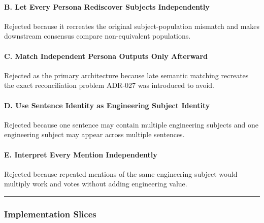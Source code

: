 \hypertarget{b-let-every-persona-rediscover-subjects-independently}{%
\paragraph{B. Let Every Persona Rediscover Subjects Independently}\label{b-let-every-persona-rediscover-subjects-independently}}

Rejected because it recreates the original subject-population mismatch and makes downstream consensus compare non-equivalent populations.

\hypertarget{c-match-independent-persona-outputs-only-afterward}{%
\paragraph{C. Match Independent Persona Outputs Only Afterward}\label{c-match-independent-persona-outputs-only-afterward}}

Rejected as the primary architecture because late semantic matching recreates the exact reconciliation problem ADR-027 was introduced to avoid.

\hypertarget{d-use-sentence-identity-as-engineering-subject-identity}{%
\paragraph{D. Use Sentence Identity as Engineering Subject Identity}\label{d-use-sentence-identity-as-engineering-subject-identity}}

Rejected because one sentence may contain multiple engineering subjects and one engineering subject may appear across multiple sentences.

\hypertarget{e-interpret-every-mention-independently}{%
\paragraph{E. Interpret Every Mention Independently}\label{e-interpret-every-mention-independently}}

Rejected because repeated mentions of the same engineering subject would multiply work and votes without adding engineering value.

\begin{center}\rule{0.5\linewidth}{0.5pt}\end{center}

\hypertarget{implementation-slices-1}{%
\subsubsection{Implementation Slices}\label{implementation-slices-1}}

